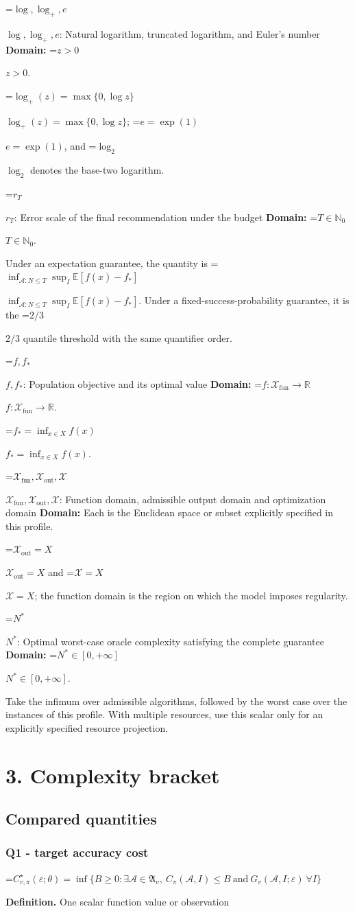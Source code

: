\documentclass[10pt,a4paper]{article}
\newcommand{\AtlasMath}[1]{\par\begingroup\centering\setbox0=\hbox{$\displaystyle #1$}\ifdim\wd0>1.4\linewidth\typeout{ATLAS WIDE FORMULA: \the\wd0}\fi\ifdim\wd0>\linewidth\resizebox{\linewidth}{!}{\box0}\else\box0\fi\par\endgroup}
\newcommand{\AtlasInlineMath}[1]{\begingroup\setbox0=\hbox{$#1$}\ifdim\wd0>.4\linewidth\endgroup\AtlasMath{#1}\else\endgroup$#1$\fi}
\begin{document}
\AtlasInlineMath{\log,\log_+,e}: Natural logarithm, truncated logarithm, and Euler's number \textbf{Domain:} \AtlasInlineMath{z>0}.

\AtlasInlineMath{\log_+(z)=\max\{0,\log z\}}; \AtlasInlineMath{e=\exp(1)}, and \AtlasInlineMath{\log_2} denotes the base-two logarithm.

\AtlasInlineMath{r_T}: Error scale of the final recommendation under the budget \textbf{Domain:} \AtlasInlineMath{T\in\mathbb{N}_0}.

Under an expectation guarantee, the quantity is \AtlasInlineMath{\inf_{\mathcal{A}:N\le T}\sup_I\mathbb{E}[f(\widehat{x})-f_*]}. Under a fixed-success-probability guarantee, it is the \AtlasInlineMath{2/3} quantile threshold with the same quantifier order.

\AtlasInlineMath{f,f_*}: Population objective and its optimal value \textbf{Domain:} \AtlasInlineMath{f:\mathcal{X}_{\mathrm{fun}}\to\mathbb{R}}.

\AtlasInlineMath{f_*=\inf_{x\in X}f(x)}.

\AtlasInlineMath{\mathcal{X}_{\mathrm{fun}},\mathcal{X}_{\mathrm{out}},\mathcal{X}}: Function domain, admissible output domain and optimization domain \textbf{Domain:} Each is the Euclidean space or subset explicitly specified in this profile.

\AtlasInlineMath{\mathcal{X}_{\mathrm{out}}=X} and \AtlasInlineMath{\mathcal{X}=X}; the function domain is the region on which the model imposes regularity.

\AtlasInlineMath{N^*}: Optimal worst-case oracle complexity satisfying the complete guarantee \textbf{Domain:} \AtlasInlineMath{N^*\in[0,+\infty]}.

Take the infimum over admissible algorithms, followed by the worst case over the instances of this profile. With multiple resources, use this scalar only for an explicitly specified resource projection.

\section{3. Complexity bracket}
\subsection{Compared quantities}
\subsubsection{Q1 - target accuracy cost}
\AtlasMath{C^\star_{v,\pi}(\varepsilon;\theta)=\inf\{B\ge0:\exists\mathcal A\in\mathfrak A_v,\ C_\pi(\mathcal A,I)\le B\ \text{and}\ G_v(\mathcal A,I;\varepsilon)\ \forall I\}}
\textbf{Definition.} One scalar function value or observation
\end{document}
